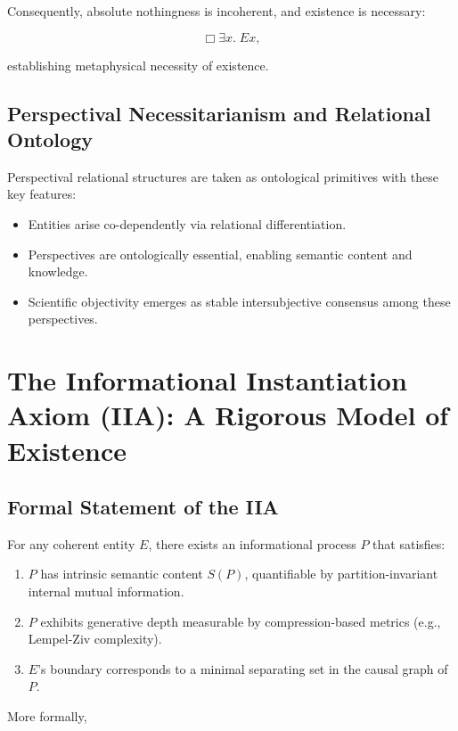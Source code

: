 \documentclass[12pt,a4paper]{article}
\begin{document}
Consequently, absolute nothingness is incoherent, and existence is necessary:

\begin{equation}\label{eq:necessity}
\Box\exists x.\; Ex,
\end{equation}

establishing metaphysical necessity of existence.

\subsection{Perspectival Necessitarianism and Relational Ontology}

Perspectival relational structures are taken as ontological primitives with these key features:

\begin{itemize}
    \item Entities arise co-dependently via relational differentiation.
    \item Perspectives are ontologically essential, enabling semantic content and knowledge.
    \item Scientific objectivity emerges as stable intersubjective consensus among these perspectives.
\end{itemize}

\section{The Informational Instantiation Axiom (IIA): A Rigorous Model of Existence}

\subsection{Formal Statement of the IIA}

For any coherent entity $E$, there exists an informational process $P$ that satisfies:

\begin{enumerate}
\item $P$ has intrinsic semantic content $S(P)$, quantifiable by partition-invariant internal mutual information.
\item $P$ exhibits generative depth measurable by compression-based metrics (e.g., Lempel-Ziv complexity).
\item $E$’s boundary corresponds to a minimal separating set in the causal graph of $P$.
\end{enumerate}

More formally,
\end{document}
